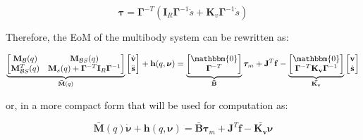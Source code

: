\begin{equation}
    \label{eqn:mot_dyn_jointspace}
    \boldsymbol{\tau} = \boldsymbol{\Gamma} ^{-T} (\mathbf{I} _R\boldsymbol{\Gamma} ^{-1} \ddot{s} + \mathbf{K}_v \boldsymbol{\Gamma} ^{-1}\dot{s})
\end{equation}

Therefore, the \ac{EoM} of the multibody system can be rewritten as:

\begin{equation}
    \underbrace{\begin{bmatrix}
            \mathbf{M} _{\mathcal{B}}(q)     & \mathbf{M} _{\mathcal{B}S}(q)                                                      \\
            \mathbf{M} _{\mathcal{B}S} ^T(q) & \mathbf{M} _s(q) + \boldsymbol{\Gamma} ^{-T}\mathbf{I} _R\boldsymbol{\Gamma} ^{-1}
        \end{bmatrix}} _{\mathbf{\bar{M}}(q)}
    \begin{bmatrix}
        \dot{\mathrm{\mathbf{v}}} \\
        \ddot{\mathbf{s}}
    \end{bmatrix}+
    \mathbf{h}
    (q,\boldsymbol{\nu}) =
    \underbrace{\begin{bmatrix}
            \mathbbm{0} \\
            \boldsymbol{\Gamma} ^{-T}
        \end{bmatrix}} _{\mathbf{\bar{B}}}
    \boldsymbol{\tau} _m
    +
    \mathbf{J} ^T
    \mathbf{f}
    -
    \underbrace{\begin{bmatrix}
            \mathbbm{0} \\
            \boldsymbol{\Gamma} ^{-T}\mathbf{K _v}\boldsymbol{\Gamma} ^{-1}
        \end{bmatrix}} _\mathbf{\bar{K _v}}
    \begin{bmatrix}
        \mathrm{\mathbf{v}} \\
        \dot{\mathbf{s}}
    \end{bmatrix}
\end{equation}

or, in a more compact form that will be used for computation as:

\begin{equation}
    \mathbf{\bar{M}}(q)\dot{\boldsymbol{\nu}} + \mathbf{h}(q,\boldsymbol{\nu}) = \mathbf{\bar{B}}\boldsymbol{\tau} _m + \mathbf{J} ^T \mathbf{f} - \bar{\mathbf{K _v}}\boldsymbol{\nu}
\end{equation}

